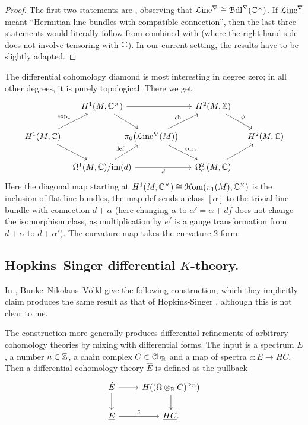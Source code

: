 \documentclass[10pt]{amsart}
\begin{document}
\begin{proof}
The first two statements are \cite[Lemma~5.2]{bunkenikolausvoelkl2016diffcoh}, observing that $\mathcal{L}\mathrm{ine}^\nabla \cong \mathcal{B}\mathrm{dl}^\nabla(\mathbb{C}^\times)$. If $\mathcal{L}\mathrm{ine}^\nabla$ meant ``Hermitian line bundles with compatible connection'', then the last three statements would literally follow from \cite[Lemma 5.4]{bunkenikolausvoelkl2016diffcoh} combined with \cite[Lemma 4.5]{bunkenikolausvoelkl2016diffcoh} (where the right hand side does not involve tensoring with $\mathbb{C}$). In our current setting, the results have to be slightly adapted.
\end{proof}

The differential cohomology diamond is most interesting in degree zero; in all other degrees, it is purely topological. There we get
\begin{equation*}
\begin{tikzcd}[column sep=0.4cm]
&[-0.2cm] 
H^1(M, \bC^\times)
\ar[dr]\ar[rr]
&[-1cm] & 
H^2(M, \bZ)
\ar[dr, "\phi"] 
&
\\ 	
H^1(M, \bC)
\ar[ur, "\exp_*"]
\ar[dr]
& & 
\pi_0\bigl(\Line^\nabla(M)\bigr)
\ar[ur, "\ch"]
\ar[dr, "\mathrm{curv}"]
& & 
H^2(M, \bC)
\\
& 
\Omega^{1}(M, \bC)/\mathrm{im}(d)
\ar[ur, "\mathrm{def}"]
\ar[rr, "d"']
& & 
\Omega^2_{\mathrm{cl}}(M, \bC) 
\ar[ur]
&
\end{tikzcd}
\end{equation*}
Here the diagonal map starting at $H^1(M, \mathbb{C}^\times) \cong \mathcal{H}\mathrm{om}(\pi_1(M), \mathbb{C}^\times)$ is the inclusion of flat line bundles, the map $\mathrm{def}$ sends a class $[\alpha]$ to the trivial line bundle with connection $d + \alpha$ (here changing $\alpha$ to $\alpha' = \alpha + df$ does not change the isomorphism class, as multiplication by $e^f$ is a gauge transformation from $d + \alpha$ to $d+ \alpha'$). The curvature map takes the curvature 2-form.

\subsection{Hopkins--Singer differential \texorpdfstring{$K$}{K}-theory.}
In \cite[\S{4.4}]{bunkenikolausvoelkl2016diffcoh}, Bunke--Nikolaus--V{\"o}lkl give the following construction, which they implicitly claim produces the same result as that of Hopkins-Singer \cite{hopkinssinger2005diffcoh}, although this is not clear to me.

The construction more generally produces differential refinements of arbitrary cohomology theories by mixing with differential forms. The input is a spectrum $E$, a number $n \in \mathbb{Z}$, a chain complex $C \in \mathcal{C}\mathrm{h}_{\mathbb{R}}$ and a map of spectra $c : E \to HC$. Then a differential cohomology theory $\hat{E}$ is defined as the pullback
\[
\begin{tikzcd}
\hat{E} 
\ar[r] \ar[d] & H((\Omega \otimes_\bR C)^{\geq n})\ar[d]
\\
\underline{E} \ar[r, "\underline{c}"]
& \underline{HC}.
\end{tikzcd}
\]
\end{document}
